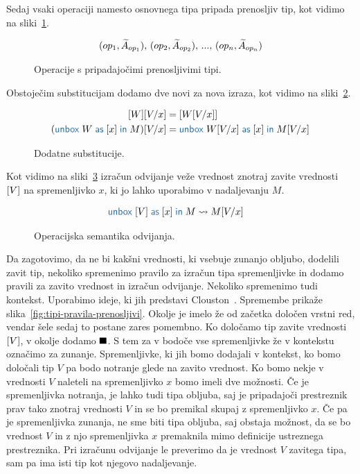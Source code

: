 Sedaj vsaki operaciji namesto osnovnega tipa pripada prenosljiv tip, kot vidimo na sliki~\ref{fig:prenosljive-operacije}.

\begin{figure}[H]
	\centering
	\small
	\begin{align*}
	(op_1, \widetilde{A}_{op_1}),\, (op_2, \widetilde{A}_{op_2}),\, ... ,\, (op_n, \widetilde{A}_{op_n})
	\end{align*}
	\vspace{-5ex}
	\caption{Operacije s pripadajočimi prenosljivimi tipi.}
	\label{fig:prenosljive-operacije}
\end{figure}

Obstoječim substitucijam dodamo dve novi za nova izraza, kot vidimo na sliki~\ref{fig:substitucija-box}.

\begin{figure}[H]
	\centering
	\small
	\begin{align*}
		\tmboxed{W}[V/x] &= \tmboxed{W[V/x]} \\
		(\tmunbox{W}{x}{M})[V/x] &= \tmunbox{W[V/x]}{x}{M[V/x]}
	\end{align*}
	\vspace{-5ex}
	\caption{Dodatne substitucije.}
	\label{fig:substitucija-box}
\end{figure}

Kot vidimo na sliki~\ref{fig:semantika-odvijanje} izračun odvijanje veže vrednost znotraj zavite vrednosti $[V]$ na spremenljivko $x$, ki jo lahko uporabimo v nadaljevanju $M$.

\begin{figure}[h]
	\centering
	\small
	\begin{align*}
	\tmunbox{[V]}{x}{M} &\reduces M[V/x]
	\end{align*}
	
	\caption{Operacijska semantika odvijanja.}
	\label{fig:semantika-odvijanje}
\end{figure}


Da zagotovimo, da ne bi kakšni vrednosti, ki vsebuje zunanjo obljubo, dodelili zavit tip, nekoliko spremenimo pravilo za izračun tipa spremenljivke in dodamo pravili za zavito vrednost in izračun odvijanje. Nekoliko spremenimo tudi kontekst. Uporabimo ideje, ki jih predstavi Clouston~\cite{fitch}. Spremembe prikaže slika~\ref{fig:tipi-pravila-prenosljivi}.
Okolje je imelo že od začetka določen vrstni red, vendar šele sedaj to postane zares pomembno. 
Ko določamo tip zavite vrednosti $[V]$, v okolje dodamo $\blacksquare$. S tem za v bodoče vse spremenljivke že v kontekstu označimo za zunanje. Spremenljivke, ki jih bomo dodajali v kontekst, ko bomo določali tip $V$ pa bodo notranje glede na zavito vrednost. Ko bomo nekje v vrednosti $V$ naleteli na spremenljivko $x$ bomo imeli dve možnosti. Če je spremenljivka notranja, je lahko tudi tipa obljuba, saj je pripadajoči prestreznik prav tako znotraj vrednosti $V$ in se bo premikal skupaj z spremenljivko $x$. Če pa je spremenljivka zunanja, ne sme biti tipa obljuba, saj obstaja možnost, da se bo vrednost $V$ in z njo spremenljivka $x$ premaknila mimo definicije ustreznega prestreznika.
Pri izračunu odvijanje le preverimo da je vrednost $V$ zavitega tipa, sam pa ima isti tip kot njegovo nadaljevanje.

